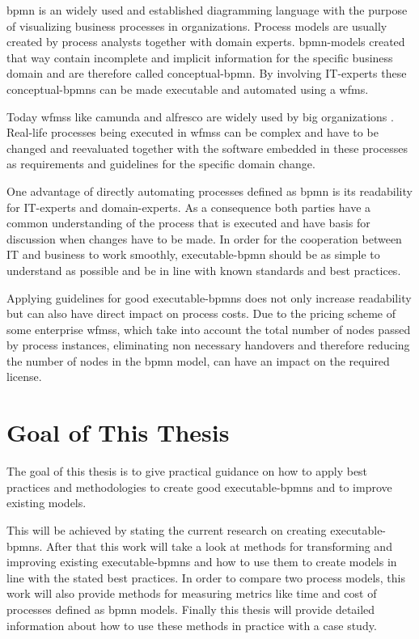 \gls{bpmn} is an widely used and established diagramming language with the purpose of visualizing business processes in organizations. Process models are usually created by process analysts together with domain experts. \gls{bpmn}-models created that way contain incomplete and implicit information for the specific business domain and are therefore called \gls{conceptual-bpmn}. By involving IT-experts these \gls{conceptual-bpmn}s can be made executable and automated using a \gls{wfms}. \cite{fundamentals}

Today \gls{wfms}s like \gls{camunda}  and \gls{alfresco} are widely used by big organizations \cite{camunda-customers} \cite{activity-customers}. Real-life processes being executed in \gls{wfms}s can be complex and have to be changed and reevaluated together with the software embedded in these processes as requirements and guidelines for the specific domain change. 

One advantage of directly automating processes defined as \gls{bpmn} is its readability for IT-experts and domain-experts. As a consequence both parties have a common understanding of the process that is executed and have basis for discussion when changes have to be made. In order for the cooperation between IT and business to work smoothly, \gls{executable-bpmn} should be as simple to understand as possible and be in line with known standards and best practices. 

Applying guidelines for good \gls{executable-bpmn}s does not only increase readability but can also have direct impact on process costs. Due to the pricing scheme of some enterprise \gls{wfms}s, which take into account the total number of nodes passed by process instances, eliminating non necessary handovers and therefore reducing the number of nodes in the \gls{bpmn} model, can have an impact on the required license. 

\section{Goal of This Thesis}
The goal of this thesis is to give practical guidance on how to apply best practices and methodologies to create good \gls{executable-bpmn}s and to improve existing models. 

This will be achieved by stating the current research on creating \gls{executable-bpmn}s. After that this work will take a look at methods for transforming and improving existing \gls{executable-bpmn}s and how to use them to create models in line with the stated best practices. In order to compare two process models, this work will also provide methods for measuring metrics like time and cost of processes defined as \gls{bpmn} models. Finally this thesis will provide detailed information about how to use these methods in practice with a case study.


